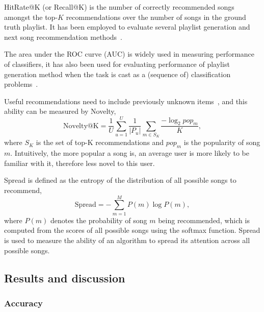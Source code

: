 HitRate@K (or Recall@K) is the number of correctly recommended songs amongst the top-$K$ recommendations over
the number of songs in the ground truth playlist. %
It has been employed to evaluate several playlist generation and next song recommendation
methods~\cite{hariri2012context,bonnin2013evaluating,bonnin2015automated,jannach2015beyond}.

The area under the ROC curve (AUC) is widely used in measuring performance of classifiers,
it has also been used for evaluating performance of playlist generation method when the task
is cast as a (sequence of) classification problems~\cite{ben2017groove}.

Useful recommendations need to include previously unknown items~\cite{herlocker2004evaluating,zhang2012auralist}, 
and this ability can be measured by Novelty,
$$
\text{Novelty@K} = \frac{1}{U} \sum_{u=1}^U \frac{1}{|P_u|} \sum_{m \in S_K} \frac{-\log_2 pop_m}{K},
$$
where $S_K$ is the set of top-K recommendations and $pop_m$ is the popularity of song $m$.
Intuitively, the more popular a song is, an average user is more likely to be familiar with it,
therefore less novel to this user.

Spread is defined as the entropy of the distribution of all possible songs to recommend,
$$
\text{Spread} = -\sum_{m=1}^M P(m) \log P(m),
$$
where $P(m)$ denotes the probability of song $m$ being recommended,
which is computed from the scores of all possible songs using the softmax function.
Spread is used to measure the ability of an algorithm to spread its attention across all possible songs.


\subsection{Results and discussion}


%



\subsubsection{Accuracy}


